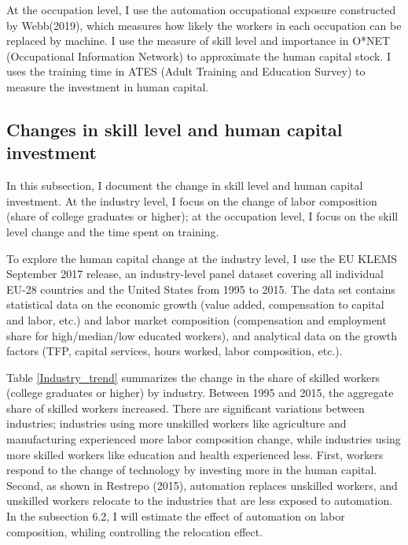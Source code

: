 \documentclass[12pt]{article}
\begin{document}
At the occupation level, I use the automation occupational exposure constructed by Webb(2019)\nocite{Webb2019}, which measures how likely the workers in each occupation can be replaced by machine. I use the measure of skill level and importance in O*NET (Occupational Information Network) to approximate the human capital stock. I uses the training time in ATES (Adult Training and Education Survey) to measure the investment in human capital. 

\subsection{Changes in skill level and human capital investment}
In this subsection, I document the change in skill level and human capital investment. At the industry level, I focus on the change of labor composition (share of college graduates or higher); at the occupation level, I focus on the skill level change and the time spent on training. 
 
To explore the human capital change at the industry level, I use the EU KLEMS September 2017 release, an industry-level panel dataset covering all individual EU-28 countries and the United States from 1995 to 2015. The data set contains statistical data on the economic growth (value added, compensation to capital and labor, etc.) and labor market composition (compensation and employment share for high/median/low educated workers), and analytical data on the growth factors (TFP, capital services, hours worked, labor composition, etc.). 

Table \ref{Industry_trend} summarizes the change in the share of skilled workers (college graduates or higher) by industry. Between 1995 and 2015, the aggregate share of skilled workers increased. There are significant variations between industries; industries using more unskilled workers like agriculture and manufacturing experienced more labor composition change, while industries using more skilled workers like education and health experienced less. First, workers respond to the change of technology by investing more in the human capital. Second, as shown in Restrepo (2015)\nocite{Restrepo2015}, automation replaces unskilled workers, and unskilled workers relocate to the industries that are less exposed to automation. In the subsection 6.2, I will estimate the effect of automation on labor composition, whiling controlling the relocation effect. 
\end{document}
